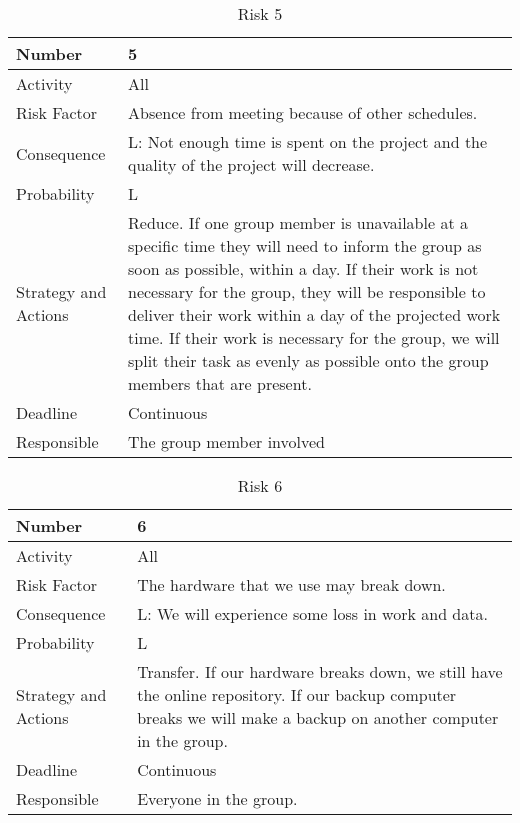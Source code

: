 \documentclass[../document.tex]{subfiles}
\begin{document}
\begin{table}[H]
\caption{Risk 5}
\begin{tabularx}{\textwidth}{|l|X|}
\hline
Number
&5
\\ \hline Activity
&All
\\ \hline Risk Factor
&Absence from meeting because of other schedules.
\\ \hline Consequence
&L: Not enough time is spent on the project and the quality of the project will decrease.
\\ \hline Probability
&L
\\ \hline Strategy and Actions
&Reduce. If one group member is unavailable at a specific time they will need to inform the group as soon as possible, within a day. If their work is not necessary for the group, they will be responsible to deliver their work within a day of the projected work time. If their work is necessary for the group, we will split their task as evenly as possible onto the group members that are present.
\\ \hline Deadline
&Continuous
\\ \hline Responsible
&The group member involved
\\ \hline
\end{tabularx}
\end{table}

\begin{table}[H]
\caption{Risk 6}
\begin{tabularx}{\textwidth}{|l|X|}
\hline
Number
&6
\\ \hline Activity
&All
\\ \hline Risk Factor
&The hardware that we use may break down.
\\ \hline Consequence
&L: We will experience some loss in work and data.
\\ \hline Probability
&L
\\ \hline Strategy and Actions
&Transfer. If our hardware breaks down, we still have the online repository. If our backup computer breaks we will make a backup on another computer in the group.
\\ \hline Deadline
&Continuous
\\ \hline Responsible
&Everyone in the group.
\\ \hline 
\end{tabularx}
\end{table}
\end{document}
